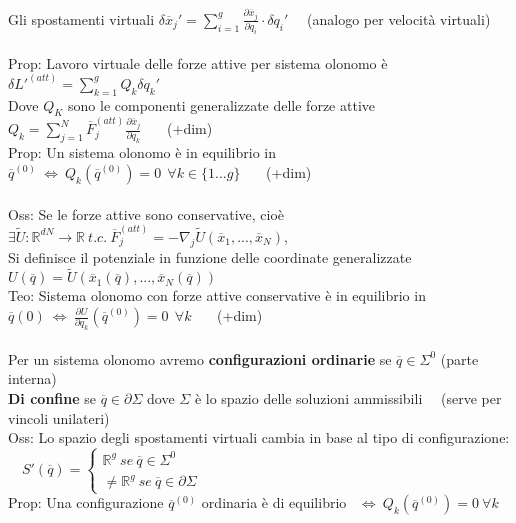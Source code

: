 \documentclass{article}
\begin{document}
Gli spostamenti virtuali  $ \delta \overline{x}_j' = \sum_{i=1}^g \frac{\partial \overline{x}_j}{\partial q_i}\cdot \delta q_i'$ \ \ (analogo per velocità virtuali)\\ \\
%
%
%
Prop: Lavoro virtuale delle forze attive per sistema olonomo è \ $\delta L'^{(att)}=\sum_{k=1}^gQ_k\delta q_k'$ \\ 
\phantom{Prop: }Dove $Q_K$ sono le componenti generalizzate delle forze attive \ \ $Q_k = \sum_{j=1}^N\overline{F}_j^{(att)}\frac{\partial\overline{x}_j}{\partial q_k}$ \ \ \ (+dim) \\
%
%
%
Prop: Un sistema olonomo è in equilibrio in $\overline{q}^{(0)} \ \Leftrightarrow \ Q_k(\overline{q}^{(0)})=0 \ \ \forall k \in \{1...g\}$ \ \ \ (+dim) \\ \\
%
%
%
Oss: Se le forze attive sono conservative, cioè $\exists \widetilde{U}:\mathbb{R}^{dN}\rightarrow\mathbb{R} \ t.c. \ \overline{F}_j^{(att)}=-\nabla_j\widetilde{U}(\overline{x}_1,...,\overline{x}_N)$, \\
\phantom{Oss: }Si definisce il potenziale in funzione delle coordinate generalizzate \ \ $U(\overline{q})=\widetilde{U}(\overline{x}_1(\overline{q}),...,\overline{x}_N(\overline{q}))$ \\
Teo: Sistema olonomo con forze attive conservative è in equilibrio in $\overline{q}(0) \ \Leftrightarrow \ \frac{\partial U}{\partial q_k}(\overline{q}^{(0)})=0 \ \ \forall k$ \ \ \ (+dim)\\ \\
%
%
%
Per un sistema olonomo avremo \textbf{configurazioni ordinarie} se $\overline{q} \in \Sigma^0$ (parte interna) \\
\phantom{} \hspace{0.25in} \textbf{Di confine} se $\overline{q} \in \partial\Sigma$ dove $\Sigma$ è lo spazio delle soluzioni ammissibili \ \ (serve per vincoli unilateri)\\
%
Oss: Lo spazio degli spostamenti virtuali cambia in base al tipo di configurazione: \ \ $S'(\overline{q}) = \begin{cases}\mathbb{R}^g \ se \ \overline{q} \in \Sigma^0 \\ \neq\mathbb{R}^g \ se \ \overline{q} \in \partial\Sigma \end{cases} $ \\
%
Prop: Una configurazione $\overline{q}^{(0)}$ ordinaria è di equilibrio \ $\Leftrightarrow \ Q_k(\overline{q}^{(0)})=0 \ \forall k$ \\
\end{document}

